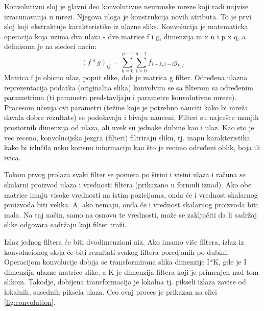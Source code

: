 \documentclass[a4paper]{article}
\begin{document}
Konvolutivni sloj je glavni deo konvolutivne neuronske mreze koji radi najvise izracunavanja u mrezi. Njegova uloga je konstrukcija novih atributa. To je prvi sloj koji ekstraktuje karakteristike iz ulazne slike. Konvolucija je matematicka operacija koja uzima dva ulaza - dve matrice f i g, dimenzija m x n i p x q, a definisana je na sledeci nacin:
$$(f * g)_{ij} = \sum_{k=0}^{p-1} \sum_{l=0}^{q-1} f_{i-k, i-l}g_{k, l}$$
Matrica f je obicno ulaz, poput slike, dok je matrica g filter. Određena ulazna reprezentacija podatka (originalna slika) konvolvira se sa filterom sa određenim parametrima (ti parametri predstavljaju i parametre konvolutivne mreze). Procesom učenja ovi parametri (težine koje je potrebno nauciti kako bi mreža davala dobre rezultate) se podešavaju i bivaju nauceni. Filteri su najcešce manjih prostornih dimenzija od ulaza, ali uvek su jednake dubine kao i ulaz. Kao sto je vec receno, konvolucijska jezgra (filteri) filtriraju sliku, tj. mapu karakteristika kako bi izlučila neku korisnu informaciju kao što je recimo određeni oblik, boja ili ivica.

Tokom prvog prolaza svaki filter se pomera po širini i visini ulaza i računa se skalarni proizvod ulaza i vrednosti filtera (prikazano u formuli iznad). Ako obe matrice imaju visoke vrednosti na istim pozicijama, onda će i vrednost skalarnog proizvoda biti velika. A, ako nemaju, onda će i vrednost skalarnog proizvoda biti mala. Na taj način, samo na osnovu te vrednosti, može se zaključiti da li sadržaj slike odgovara sadržaju koji filter traži.

Izlaz jednog filtera će biti dvodimenzioni niz. Ako imamo više filtera, izlaz iz konvolucionog sloja će biti rezultati svakog filtera poredjanih po dubini. Operacijom konvolucije dobija se transformirana slika dimenzije I*K, gde je I dimenzija ulazne matrice slike, a K je dimenzija filtera koji je primenjen nad tom slikom. Takodje, dobijena transformacija je lokalna tj. pikseli izlaza zavise od lokalnih, susednih piksela ulaza. Ceo ovaj proces je prikazan na slici \ref{fig:convolution}.


\end{document}
